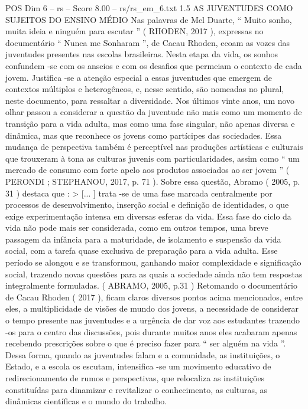 \begin{textsample}{POS Dim 6 – rs – Score 8.00 – rs/rs\_em\_6.txt}  \label{ex:f6_pos_185}
1.5 AS JUVENTUDES COMO SUJEITOS DO ENSINO MÉDIO Nas palavras de Mel Duarte, “ Muito sonho, muita ideia e ninguém para escutar ” ( RHODEN, 2017 ), expressas no documentário “ Nunca me Sonharam ”, de Cacau Rhoden, ecoam as vozes das juventudes presentes nas escolas brasileiras.
Nesta etapa da vida, os sonhos confundem -se com os anseios e com os desafios que permeiam o contexto de cada jovem.
Justifica -se a atenção especial a essas juventudes que emergem de contextos múltiplos e heterogêneos, e, nesse sentido, são nomeadas no plural, neste documento, para ressaltar a diversidade.
Nos últimos vinte anos, um novo olhar passou a considerar a questão da juventude não mais como um momento de transição para a vida adulta, mas como uma fase singular, não apenas diversa e dinâmica, mas que reconhece os jovens como partícipes das sociedades.
Essa mudança de perspectiva também é perceptível nas produções artísticas e culturais que trouxeram à tona as culturas juvenis com particularidades, assim como “ um mercado de consumo com forte apelo aos produtos associados ao ser jovem ” ( PERONDI ; STEPHANOU, 2017, p. 71 ).
Sobre essa questão, Abramo ( 2005, p. 31 ) destaca que : > [... ] trata -se de uma fase marcada centralmente por processos de desenvolvimento, inserção social e definição de identidades, o que exige experimentação intensa em diversas esferas da vida.
Essa fase do ciclo da vida não pode mais ser considerada, como em outros tempos, uma breve passagem da infância para a maturidade, de isolamento e suspensão da vida social, com a tarefa quase exclusiva de preparação para a vida adulta.
Esse período se alongou e se transformou, ganhando maior complexidade e significação social, trazendo novas questões para as quais a sociedade ainda não tem respostas integralmente formuladas. ( ABRAMO, 2005, p.31 ) Retomando o documentário de Cacau Rhoden ( 2017 ), ficam claros diversos pontos acima mencionados, entre eles, a multiplicidade de visões de mundo dos jovens, a necessidade de considerar o tempo presente nas juventudes e a urgência de dar voz aos estudantes trazendo -os para o centro das discussões, pois durante muitos anos eles acabaram apenas recebendo prescrições sobre o que é preciso fazer para “ ser alguém na vida ”.
Dessa forma, quando as juventudes falam e a comunidade, as instituições, o Estado, e a escola os escutam, intensifica -se um movimento educativo de redirecionamento de rumos e perspectivas, que relocaliza as instituições constituídas para dinamizar e revitalizar o conhecimento, as culturas, as dinâmicas científicas e o mundo do trabalho.

\end{textsample}
